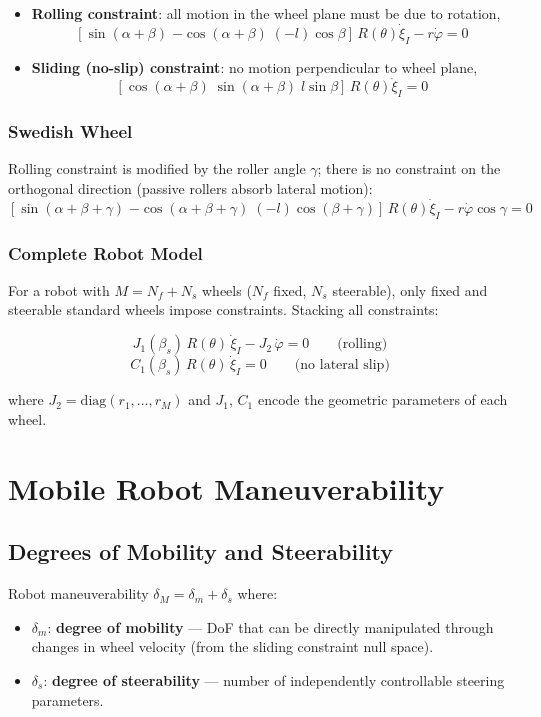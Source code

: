 \documentclass[11pt,a4paper]{article}
\theoremstyle{definition}
\theoremstyle{plain}
\theoremstyle{remark}
\begin{document}
\begin{itemize}
    \item \textbf{Rolling constraint}: all motion in the wheel plane must be due to rotation,
    \[
    [\sin(\alpha+\beta) \; {-\cos(\alpha+\beta)} \; {(-l)\cos\beta}]\,R(\theta)\dot{\xi}_I - r\dot{\varphi} = 0
    \]
    \item \textbf{Sliding (no-slip) constraint}: no motion perpendicular to wheel plane,
    \[
    [\cos(\alpha+\beta) \; \sin(\alpha+\beta) \; l\sin\beta]\,R(\theta)\dot{\xi}_I = 0
    \]
\end{itemize}

\subsubsection*{Swedish Wheel}

Rolling constraint is modified by the roller angle $\gamma$; there is no constraint on the orthogonal direction (passive rollers absorb lateral motion):
\[
[\sin(\alpha+\beta+\gamma) \; {-\cos(\alpha+\beta+\gamma)} \; {(-l)\cos(\beta+\gamma)}]\,R(\theta)\dot{\xi}_I - r\dot{\varphi}\cos\gamma = 0
\]

\subsubsection*{Complete Robot Model}

For a robot with $M = N_f + N_s$ wheels ($N_f$ fixed, $N_s$ steerable), only fixed and steerable standard wheels impose constraints. Stacking all constraints:

\[
J_1(\beta_s)\,R(\theta)\,\dot{\xi}_I - J_2\,\dot{\varphi} = 0 \qquad \text{(rolling)}
\]
\[
C_1(\beta_s)\,R(\theta)\,\dot{\xi}_I = 0 \qquad \text{(no lateral slip)}
\]

where $J_2 = \mathrm{diag}(r_1, \ldots, r_M)$ and $J_1$, $C_1$ encode the geometric parameters of each wheel.

\section{Mobile Robot Maneuverability}

\subsection{Degrees of Mobility and Steerability}

\begin{tcolorbox}[colback=blue!5!white,colframe=blue!75!black,title=\textbf{Maneuverability}]
Robot maneuverability $\delta_M = \delta_m + \delta_s$ where:
\begin{itemize}
    \item $\delta_m$: \textbf{degree of mobility} — DoF that can be directly manipulated through changes in wheel velocity (from the sliding constraint null space).
    \item $\delta_s$: \textbf{degree of steerability} — number of independently controllable steering parameters.
\end{itemize}
\end{tcolorbox}
\end{document}
